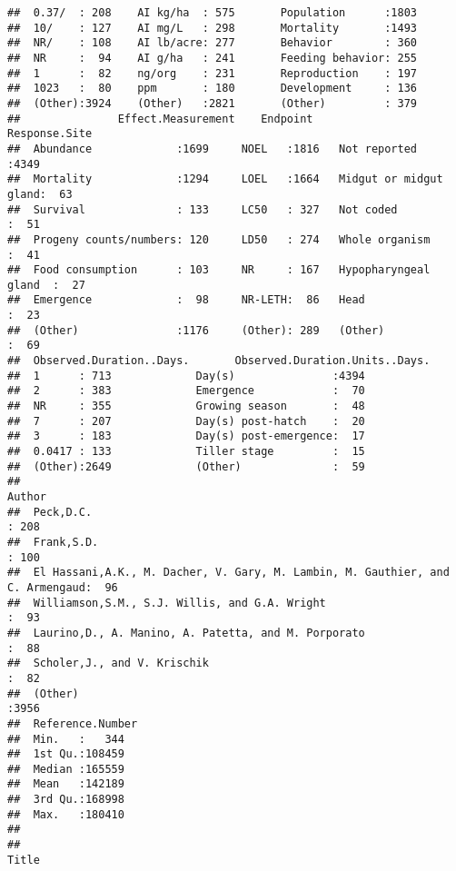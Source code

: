 \documentclass[
  12pt,
]{article}
\begin{document}
\begin{verbatim}
##  0.37/  : 208    AI kg/ha  : 575       Population      :1803  
##  10/    : 127    AI mg/L   : 298       Mortality       :1493  
##  NR/    : 108    AI lb/acre: 277       Behavior        : 360  
##  NR     :  94    AI g/ha   : 241       Feeding behavior: 255  
##  1      :  82    ng/org    : 231       Reproduction    : 197  
##  1023   :  80    ppm       : 180       Development     : 136  
##  (Other):3924    (Other)   :2821       (Other)         : 379  
##               Effect.Measurement    Endpoint                   Response.Site 
##  Abundance             :1699     NOEL   :1816   Not reported          :4349  
##  Mortality             :1294     LOEL   :1664   Midgut or midgut gland:  63  
##  Survival              : 133     LC50   : 327   Not coded             :  51  
##  Progeny counts/numbers: 120     LD50   : 274   Whole organism        :  41  
##  Food consumption      : 103     NR     : 167   Hypopharyngeal gland  :  27  
##  Emergence             :  98     NR-LETH:  86   Head                  :  23  
##  (Other)               :1176     (Other): 289   (Other)               :  69  
##  Observed.Duration..Days.       Observed.Duration.Units..Days.
##  1      : 713             Day(s)               :4394          
##  2      : 383             Emergence            :  70          
##  NR     : 355             Growing season       :  48          
##  7      : 207             Day(s) post-hatch    :  20          
##  3      : 183             Day(s) post-emergence:  17          
##  0.0417 : 133             Tiller stage         :  15          
##  (Other):2649             (Other)              :  59          
##                                                                            Author    
##  Peck,D.C.                                                                    : 208  
##  Frank,S.D.                                                                   : 100  
##  El Hassani,A.K., M. Dacher, V. Gary, M. Lambin, M. Gauthier, and C. Armengaud:  96  
##  Williamson,S.M., S.J. Willis, and G.A. Wright                                :  93  
##  Laurino,D., A. Manino, A. Patetta, and M. Porporato                          :  88  
##  Scholer,J., and V. Krischik                                                  :  82  
##  (Other)                                                                      :3956  
##  Reference.Number
##  Min.   :   344  
##  1st Qu.:108459  
##  Median :165559  
##  Mean   :142189  
##  3rd Qu.:168998  
##  Max.   :180410  
##                  
##                                                                                                                                         Title     

\end{verbatim}
\end{document}
